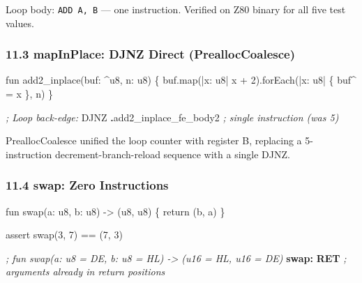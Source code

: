 \documentclass[
  11pt,
  a4paper,
]{report}
\newenvironment{Shaded}{\begin{snugshade}\small}{\end{snugshade}}
\newcommand{\CommentTok}[1]{\textcolor[rgb]{0.56,0.35,0.01}{\textit{#1}}}
\newcommand{\ControlFlowTok}[1]{\textcolor[rgb]{0.13,0.29,0.53}{\textbf{#1}}}
\newcommand{\FunctionTok}[1]{\textcolor[rgb]{0.13,0.29,0.53}{\textbf{#1}}}
\newcommand{\NormalTok}[1]{#1}
\newcommand{\OperatorTok}[1]{\textcolor[rgb]{0.81,0.36,0.00}{\textbf{#1}}}
\begin{document}
Loop body: \texttt{ADD\ A,\ B} --- one instruction. Verified on Z80
binary for all five test values.

\subsubsection{11.3 mapInPlace: DJNZ Direct
(PreallocCoalesce)}\label{mapinplace-djnz-direct-prealloccoalesce}

\begin{Shaded}
\begin{Highlighting}[]
\NormalTok{fun add2\_inplace(buf: \^{}u8, n: u8) \{}
\NormalTok{    buf.map(|x: u8| x + 2).forEach(|x: u8| \{ buf\^{} = x \}, n)}
\NormalTok{\}}
\end{Highlighting}
\end{Shaded}

\begin{Shaded}
\begin{Highlighting}[]
\CommentTok{; Loop back{-}edge:}
\NormalTok{    DJNZ }\OperatorTok{.}\NormalTok{add2\_inplace\_fe\_body2    }\CommentTok{; single instruction (was 5)}
\end{Highlighting}
\end{Shaded}

PreallocCoalesce unified the loop counter with register B, replacing a
5-instruction decrement-branch-reload sequence with a single DJNZ.

\subsubsection{11.4 swap: Zero
Instructions}\label{swap-zero-instructions}

\begin{Shaded}
\begin{Highlighting}[]
\NormalTok{fun swap(a: u8, b: u8) {-}\textgreater{} (u8, u8) \{ return (b, a) \}}

\NormalTok{assert swap(3, 7) == (7, 3)}
\end{Highlighting}
\end{Shaded}

\begin{Shaded}
\begin{Highlighting}[]
\CommentTok{; fun swap(a: u8 = DE, b: u8 = HL) {-}\textgreater{} (u16 = HL, u16 = DE)}
\FunctionTok{swap:}
    \ControlFlowTok{RET}         \CommentTok{; arguments already in return positions}
\end{Highlighting}
\end{Shaded}
\end{document}
